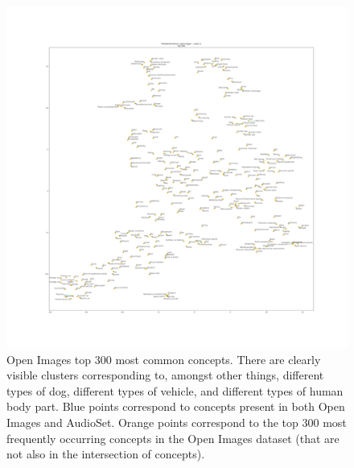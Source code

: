 \begin{figure}[H]
    \centering
    \includegraphics[width=1.0\textwidth]{images/method/probabilistic_independent/top300_tsne_openimages__ProbabilisticGlove_1.png}
    \caption{
        Open Images top 300 most common concepts. There are clearly visible clusters corresponding to, amongst other things, different types of dog, different types of vehicle, and different types of human body part. Blue points correspond to concepts present in both Open Images and AudioSet. Orange points correspond to the top 300 most frequently occurring concepts in the Open Images dataset (that are not also in the intersection of concepts).
    }
\end{figure}


